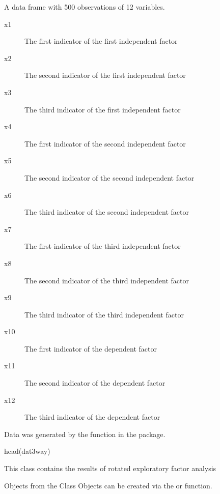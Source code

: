 \documentclass[a4paper]{book}
\begin{document}
\begin{Format}
A data frame with 500 observations of 12 variables.
\begin{description}

\item[x1] The first indicator of the first independent factor
\item[x2] The second indicator of the first independent factor
\item[x3] The third indicator of the first independent factor
\item[x4] The first indicator of the second independent factor
\item[x5] The second indicator of the second independent factor
\item[x6] The third indicator of the second independent factor
\item[x7] The first indicator of the third independent factor
\item[x8] The second indicator of the third independent factor
\item[x9] The third indicator of the third independent factor
\item[x10] The first indicator of the dependent factor
\item[x11] The second indicator of the dependent factor
\item[x12] The third indicator of the dependent factor

\end{description}

\end{Format}
%
\begin{Source}\relax
Data was generated by the  function in the  package.
\end{Source}
%
\begin{Examples}
\begin{ExampleCode}
head(dat3way)
\end{ExampleCode}
\end{Examples}
%
\begin{Description}\relax
This class contains the results of rotated exploratory factor analysis 
\end{Description}
%
\begin{Section}{Objects from the Class}
Objects can be created via the  or  function.
\end{Section}
\end{document}
